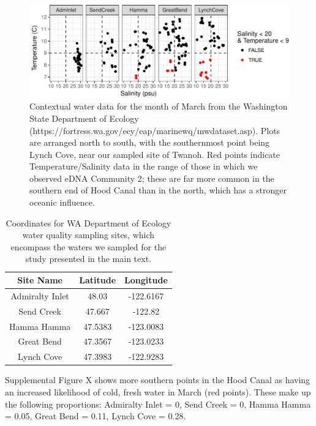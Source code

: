 \documentclass[fleqn,10pt,lineno]{wlpeerj} %
\begin{document}
\begin{figure}

{\centering \includegraphics{20171117_Tides_and_eDNA_RPK_files/figure-latex/ContextualWaterData_WAEcology-1} 

}

\caption{\label{fig:SupplementalWaterChem}Contextual water data for the month of March from the Washington State Department of Ecology (https://fortress.wa.gov/ecy/eap/marinewq/mwdataset.asp). Plots are arranged north to south, with the southernmost point being Lynch Cove, near our sampled site of Twanoh. Red points indicate Temperature/Salinity data in the range of those in which we observed eDNA Community 2; these are far more common in the southern end of Hood Canal than in the north, which has a stronger oceanic influence.}\label{fig:ContextualWaterData_WAEcology}
\end{figure}\begin{table}

\caption{\label{tab:ContextualWaterData_WAEcology}Coordinates for WA Department of Ecology water quality sampling sites, which encompass the waters we sampled for the study presented in the main text.}
\centering
\begin{tabular}[t]{c|c|c}
\hline
Site Name & Latitude & Longitude\\
\hline
Admiralty Inlet & 48.03 & -122.6167\\
\hline
Send Creek & 47.667 & -122.82\\
\hline
Hamma Hamma & 47.5383 & -123.0083\\
\hline
Great Bend & 47.3567 & -123.0233\\
\hline
Lynch Cove & 47.3983 & -122.9283\\
\hline
\end{tabular}
\end{table}

Supplemental Figure X shows more southern points in the Hood Canal as
having an increased likelihood of cold, fresh water in March (red
points). These make up the following proportions: Admiralty Inlet = 0,
Send Creek = 0, Hamma Hamma = 0.05, Great Bend = 0.11, Lynch Cove =
0.28.
\end{document}
